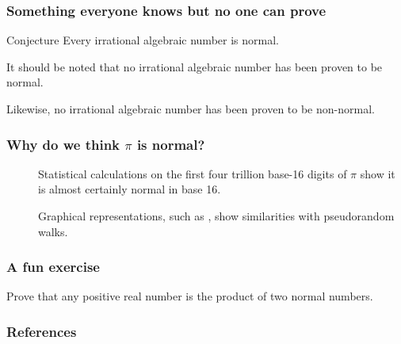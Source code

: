 \documentclass{beamer}
\begin{document}
\begin{frame}
\frametitle{Something everyone knows but no one can prove}
\begin{block}{Conjecture}
Every irrational algebraic number is normal.
\end{block}

It should be noted that no irrational algebraic number has been proven to be normal.

Likewise, no irrational algebraic number has been proven to be non-normal.
\end{frame}

\begin{frame}
\frametitle{Why do we think $\pi$ is normal?}
\begin{description}
\item[\cite{bailey2012empirical}] Statistical calculations on the first four trillion base-16 digits of $\pi$ show it is almost certainly normal in base 16.
\item[\cite{artacho2012walking}] Graphical representations, such as \href{http://gigapan.org/gigapans/106803}{\color{blue}{this one of 100 billion base-4 digits of $\pi$}}, show similarities with pseudorandom walks.
\end{description}
\end{frame}

\begin{frame}
\frametitle{A fun exercise}
Prove that any positive real number is the product of two normal numbers.
\end{frame}

\begin{frame}[allowframebreaks]
\frametitle{References}

%

\end{frame}
\end{document}
